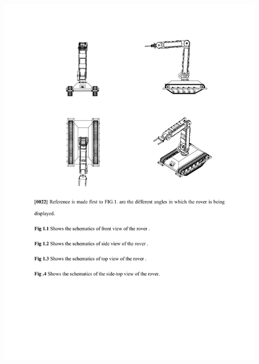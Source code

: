 \documentclass[12pt,a4paper]{report}
\begin{document}
\includegraphics[scale =0.7]{images/patent/patent_doc/output-0004.jpg}
\newpage
\end{document}

